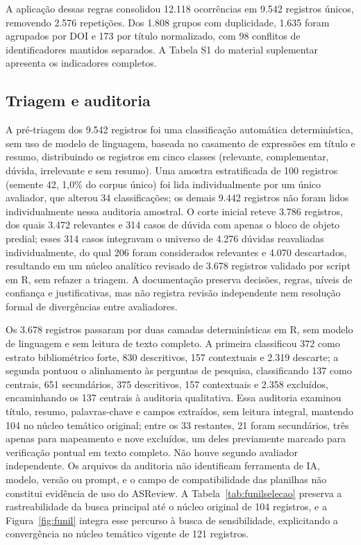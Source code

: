 A aplicação dessas regras consolidou 12.118 ocorrências em 9.542 registros únicos, removendo 2.576 repetições. Dos 1.808 grupos com duplicidade, 1.635 foram agrupados por DOI e 173 por título normalizado, com 98 conflitos de identificadores mantidos separados. A Tabela S1 do material suplementar apresenta os indicadores completos.

\subsection{Triagem e auditoria}

A pré-triagem dos 9.542 registros foi uma classificação automática determinística, sem uso de modelo de linguagem, baseada no casamento de expressões em título e resumo, distribuindo os registros em cinco classes (relevante, complementar, dúvida, irrelevante e sem resumo). Uma amostra estratificada de 100 registros (semente 42, 1,0\% do corpus único) foi lida individualmente por um único avaliador, que alterou 34 classificações; os demais 9.442 registros não foram lidos individualmente nessa auditoria amostral. O corte inicial reteve 3.786 registros, dos quais 3.472 relevantes e 314 casos de dúvida com apenas o bloco de objeto predial; esses 314 casos integravam o universo de 4.276 dúvidas reavaliadas individualmente, do qual 206 foram considerados relevantes e 4.070 descartados, resultando em um núcleo analítico revisado de 3.678 registros validado por script em R, sem refazer a triagem. A documentação preserva decisões, regras, níveis de confiança e justificativas, mas não registra revisão independente nem resolução formal de divergências entre avaliadores.

Os 3.678 registros passaram por duas camadas determinísticas em R, sem modelo de linguagem e sem leitura de texto completo. A primeira classificou 372 como estrato bibliométrico forte, 830 descritivos, 157 contextuais e 2.319 descarte; a segunda pontuou o alinhamento às perguntas de pesquisa, classificando 137 como centrais, 651 secundários, 375 descritivos, 157 contextuais e 2.358 excluídos, encaminhando os 137 centrais à auditoria qualitativa. Essa auditoria examinou título, resumo, palavras-chave e campos extraídos, sem leitura integral, mantendo 104 no núcleo temático original; entre os 33 restantes, 21 foram secundários, três apenas para mapeamento e nove excluídos, um deles previamente marcado para verificação pontual em texto completo. Não houve segundo avaliador independente. Os arquivos da auditoria não identificam ferramenta de IA, modelo, versão ou prompt, e o campo de compatibilidade das planilhas não constitui evidência de uso do ASReview. A Tabela~\ref{tab:funilselecao} preserva a rastreabilidade da busca principal até o núcleo original de 104 registros, e a Figura~\ref{fig:funil} integra esse percurso à busca de sensibilidade, explicitando a convergência no núcleo temático vigente de 121 registros.

